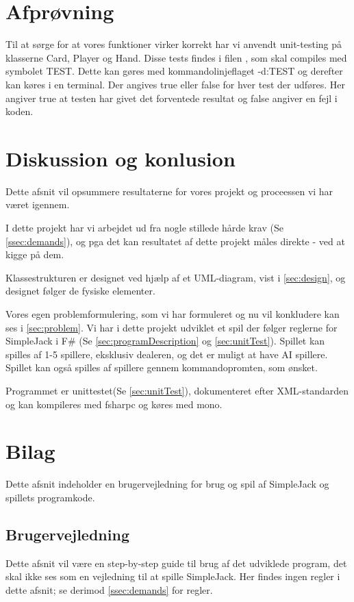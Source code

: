 \documentclass[a4paper]{article}
\newcommand{\namedref}[1]{\autoref{#1}} %
\begin{document}
  \section{Afprøvning} \label{sec:unitTest}
    Til at sørge for at vores funktioner virker korrekt har vi
    anvendt unit-testing på klasserne Card, Player og Hand.
    Disse tests findes i filen , som skal
    compiles med symbolet TEST. Dette kan gøres med
    kommandolinjeflaget -d:TEST og derefter kan køres i en
    terminal. Der angives true eller false for hver test
    der udføres. Her angiver true at testen har givet det
    forventede resultat og false angiver en fejl i koden.

	\section{Diskussion og konlusion} \label{sec:conclusion}
    Dette afsnit vil opsummere resultaterne for vores projekt og proceessen vi har været igennem.

    I dette projekt har vi arbejdet ud fra nogle stillede hårde krav (Se \namedref{ssec:demands}),
    og pga det kan resultatet af dette projekt måles direkte - ved at kigge på dem.

    Klassestrukturen er designet ved hjælp af et UML-diagram, vist i \namedref{sec:design},
    og designet følger de fysiske elementer.

    Vores egen problemformulering, som vi har formuleret og nu vil konkludere kan ses i \namedref{sec:problem}.
    Vi har i dette projekt udviklet et spil der følger reglerne for SimpleJack i F\# (Se \namedref{sec:programDescription} og \namedref{sec:unitTest}).
    Spillet kan spilles af 1-5 spillere, eksklusiv dealeren, og det er muligt at have AI spillere.
    Spillet kan også spilles af spillere gennem kommandopromten, som ønsket.

    Programmet er unittestet(Se \namedref{sec:unitTest}), dokumenteret efter XML-standarden og kan kompileres med fsharpc og køres med mono.
  
  \section{Bilag}
      Dette afsnit indeholder en brugervejledning for brug og spil af SimpleJack og spillets programkode.

      \subsection{Brugervejledning} \label{ssec:manual}
        Dette afsnit vil være en step-by-step guide til brug af det udviklede program,
        det skal ikke ses som en vejledning til at spille SimpleJack. Her findes ingen regler
        i dette afsnit; se derimod \namedref{ssec:demands} for regler.
\end{document}
